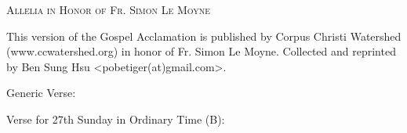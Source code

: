 \documentclass[11pt]{article} %
\begin{document}
\begin{center}\begin{huge}\textsc{Allelia in Honor of Fr. Simon Le Moyne}\end{huge}\end{center}


\def\greinitialformat#1{%
  {\fontsize{43}{43}\selectfont #1}%
}

\redlines




\begin{paragraph}\noindent
This version of the Gospel Acclamation is published by 
Corpus Christi Watershed (www.ccwatershed.org) in honor
of Fr. Simon Le Moyne. Collected and reprinted by Ben Sung Hsu
<pobetiger(at)gmail.com>.
\newline
\newline
\end{paragraph}


\begin{paragraph}\noindent\begin{large}
Generic Verse:
\end{large}\newline\end{paragraph}


\newpage


\begin{paragraph}\noindent\begin{large}
Verse for 27th Sunday in Ordinary Time (B):
\end{large}\newline\end{paragraph}
\end{document}

